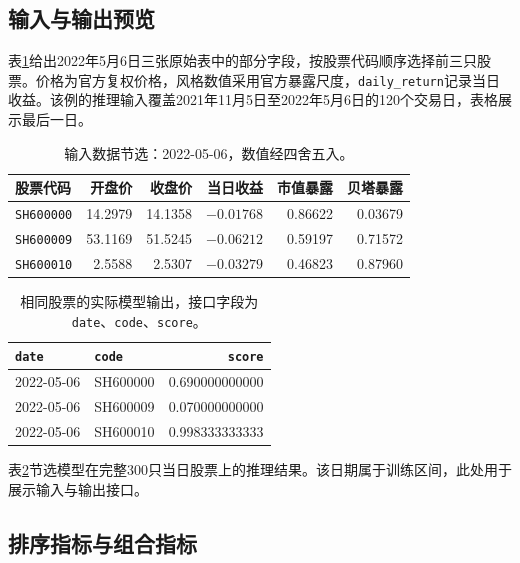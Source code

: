\documentclass[UTF8,11pt,a4paper,fontset=fandol]{ctexart}
\begin{document}
\subsection{输入与输出预览}
表\ref{tab:inputpreview}给出2022年5月6日三张原始表中的部分字段，按股票代码顺序选择前三只股票。价格为官方复权价格，风格数值采用官方暴露尺度，\texttt{daily\_return}记录当日收益。该例的推理输入覆盖2021年11月5日至2022年5月6日的120个交易日，表格展示最后一日。

\begin{table}[htbp]\centering\small
\caption{输入数据节选：2022-05-06，数值经四舍五入。}\label{tab:inputpreview}
\begin{tabular}{lrrrrr}\toprule
股票代码 & 开盘价 & 收盘价 & 当日收益 & 市值暴露 & 贝塔暴露\\\midrule
\texttt{SH600000} & 14.2979 & 14.1358 & $-0.01768$ & 0.86622 & 0.03679\\
\texttt{SH600009} & 53.1169 & 51.5245 & $-0.06212$ & 0.59197 & 0.71572\\
\texttt{SH600010} & 2.5588 & 2.5307 & $-0.03279$ & 0.46823 & 0.87960\\\bottomrule
\end{tabular}
\end{table}

\begin{table}[htbp]\centering\small
\caption{相同股票的实际模型输出，接口字段为\texttt{date}、\texttt{code}、\texttt{score}。}\label{tab:outputpreview}
\begin{tabular}{llr}\toprule
\texttt{date} & \texttt{code} & \texttt{score}\\\midrule
2022-05-06 & SH600000 & 0.690000000000\\
2022-05-06 & SH600009 & 0.070000000000\\
2022-05-06 & SH600010 & 0.998333333333\\\bottomrule
\end{tabular}
\end{table}

表\ref{tab:outputpreview}节选模型在完整300只当日股票上的推理结果。该日期属于训练区间，此处用于展示输入与输出接口。

\subsection{排序指标与组合指标}
\end{document}
